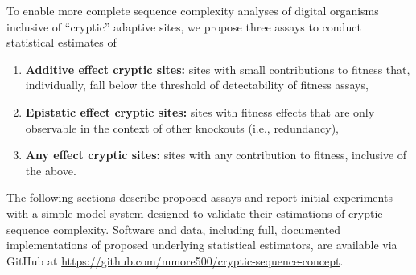



To enable more complete sequence complexity analyses of digital organisms inclusive of ``cryptic'' adaptive sites, we propose three assays to conduct statistical estimates of
\begin{enumerate}
\item \textbf{Additive effect cryptic sites:} sites with small contributions to fitness that, individually, fall below the threshold of detectability of fitness assays,
\item \textbf{Epistatic effect cryptic sites:} sites with fitness effects that are only observable in the context of other knockouts (i.e., redundancy),
\item \textbf{Any effect cryptic sites:} sites with any contribution to fitness, inclusive of the above.
\end{enumerate}

The following sections describe proposed assays and report initial experiments with a simple model system designed to validate their estimations of cryptic sequence complexity.
Software and data, including full, documented implementations of proposed underlying statistical estimators, are available via GitHub at \url{https://github.com/mmore500/cryptic-sequence-concept}.
